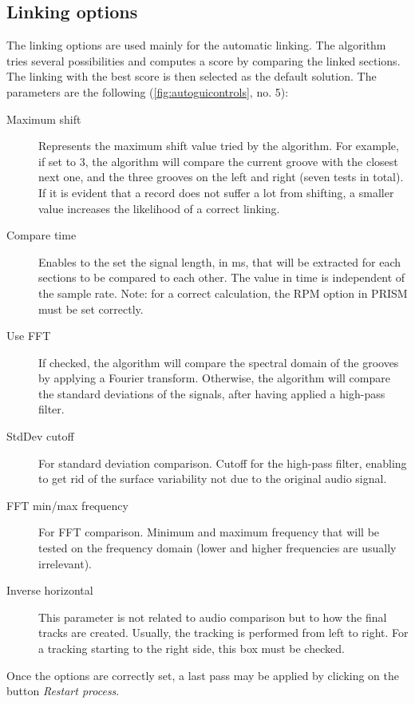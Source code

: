 \subsection{Linking options}

The linking options are used mainly for the automatic linking. The algorithm tries several possibilities and computes a score by comparing the linked sections. The linking with the best score is then selected as the default solution. The parameters are the following (\autoref{fig:autoguicontrols}, no. 5):

\begin{description}
\item[Maximum shift] Represents the maximum shift value tried by the algorithm. For example, if set to 3, the algorithm will compare the current groove with the closest next one, and the three grooves on the left and right (seven tests in total). If it is evident that a record does not suffer a lot from shifting, a smaller value increases the likelihood of a correct linking.
\item[Compare time] Enables to the set the signal length, in \si{\milli\second}, that will be extracted for each sections to be compared to each other. The value in time is independent of the sample rate. Note: for a correct calculation, the RPM option in PRISM must be set correctly.
\item[Use FFT] If checked, the algorithm will compare the spectral domain of the grooves by applying a Fourier transform. Otherwise, the algorithm will compare the standard deviations of the signals, after having applied a high-pass filter.
\item[StdDev cutoff] For standard deviation comparison. Cutoff for the high-pass filter, enabling to get rid of the surface variability not due to the original audio signal.
\item[FFT min/max frequency] For FFT comparison. Minimum and maximum frequency that will be tested on the frequency domain (lower and higher frequencies are usually irrelevant).
\item[Inverse horizontal] This parameter is not related to audio comparison but to how the final tracks are created. Usually, the tracking is performed from left to right. For a tracking starting to the right side, this box must be checked.
\end{description}

Once the options are correctly set, a last pass may be applied by clicking on the button \emph{Restart process}.

